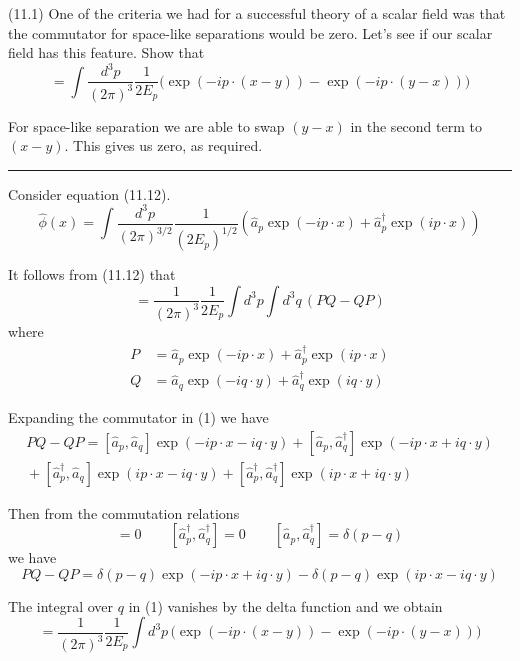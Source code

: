 \documentclass[12pt]{article}
\begin{document}
(11.1)
One of the criteria we had for a successful theory
of a scalar field was that the commutator for space-like
separations would be zero. Let's see if our scalar
field has this feature. Show that
\begin{equation*}
[\hat\phi(x),\hat\phi(y)]=\int
\frac{d^3p}{(2\pi)^3}\frac{1}{2E_p}
\big(
\exp(-ip\cdot(x-y))-\exp(-ip\cdot(y-x))
\big)
\tag{11.51}
\end{equation*}

For space-like separation we are able to swap $(y-x)$
in the second term to $(x-y)$. This gives us zero,
as required.

\bigskip
\hrule

\bigskip
Consider equation (11.12).
\begin{equation*}
\hat\phi(x)=\int\frac{d^3p}{(2\pi)^{3/2}}\frac{1}{(2E_p)^{1/2}}
\left(\hat a_p\exp(-ip\cdot x)+\hat a_p^\dag\exp(ip\cdot x)\right)
\tag{11.12}
\end{equation*}

It follows from (11.12) that
\begin{equation*}
[\hat\phi(x),\hat\phi(y)]=\frac{1}{(2\pi)^3}\frac{1}{2E_p}
\int d^3p\int d^3q\,(PQ-QP)
\tag{1}
\end{equation*}
where
\begin{align*}
P&=\hat a_p\exp(-ip\cdot x)+\hat a_p^\dag\exp(ip\cdot x)
\\
Q&=\hat a_q\exp(-iq\cdot y)+\hat a_q^\dag\exp(iq\cdot y)
\end{align*}

Expanding the commutator in (1) we have
\begin{multline*}
PQ-QP=
[\hat a_p,\hat a_q]\exp(-ip\cdot x-iq\cdot y)
+[\hat a_p,\hat a_q^\dag]\exp(-ip\cdot x+iq\cdot y)
\\
{}+[\hat a_p^\dag,\hat a_q]\exp(ip\cdot x-iq\cdot y)
+[\hat a_p^\dag,\hat a_q^\dag]\exp(ip\cdot x+iq\cdot y)
\end{multline*}

Then from the commutation relations
\begin{equation*}
[\hat a_p,\hat a_q]=0
\qquad
[\hat a_p^\dag,\hat a_q^\dag]=0
\qquad
[\hat a_p,\hat a_q^\dag]=\delta(p-q)
\end{equation*}
we have
\begin{equation*}
PQ-QP=\delta(p-q)\exp(-ip\cdot x+iq\cdot y)-\delta(p-q)\exp(ip\cdot x-iq\cdot y)
\end{equation*}

The integral over $q$ in (1) vanishes by the delta function and we obtain
\begin{equation*}
[\hat\phi(x),\hat\phi(y)]=\frac{1}{(2\pi)^3}\frac{1}{2E_p}
\int d^3p\,\big(\exp(-ip\cdot(x-y))-\exp(-ip\cdot(y-x))\big)
\end{equation*}

\end{document}
